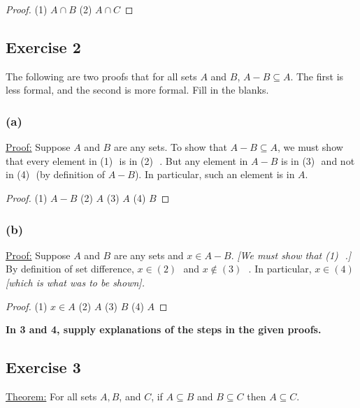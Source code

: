 \documentclass[14pt]{extarticle}
\newcommand{\fbl}{\underline{\hspace{1cm}}\,\,}
\newcommand{\cy}{\color{cyan}}
\begin{document}
\begin{proof}
  (1) \(A \cap B\) (2) \(A \cap C\)
\end{proof}

\subsection{Exercise 2}
The following are two proofs that for all sets $A$ and $B$, \(A - B \subseteq A\). The first is less formal, and the
second is more formal. Fill in the blanks.

\subsubsection{(a)}
\underline{Proof:} Suppose $A$ and $B$ are any sets. To show that \(A - B \subseteq A\), we must show that every
element in (1) \fbl is in (2) \fbl. But any element in \(A - B\) is in (3) \fbl and not in (4) \fbl (by definition of
\(A - B\)). In particular, such an element is in $A$.

\begin{proof}
  (1) $A - B$ (2) $A$ (3) $A$ (4) $B$
\end{proof}

\subsubsection{(b)}
\underline{Proof:} Suppose $A$ and $B$ are any sets and \(x \in A - B\). {\it [We must show that (1) \fbl.]} By
definition of set difference, \(x \in (2)\) \fbl and \(x \notin (3)\) \fbl. In particular, \(x \in (4)\)
{\it [which is what was to be shown].}

\begin{proof}
  (1) $x \in A$ (2) $A$ (3) $B$ (4) $A$
\end{proof}

{\bf \cy In 3 and 4, supply explanations of the steps in the given proofs.}

\subsection{Exercise 3}
\underline{Theorem:} For all sets $A, B$, and $C$, if \(A \subseteq B\) and \(B \subseteq C\) then \(A \subseteq C\).
\end{document}
